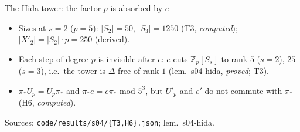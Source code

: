 \begin{frame}{The Hida tower: the factor $p$ is absorbed by $e$}
  \footnotesize
  \begin{center}
  \end{center}
  \begin{itemize}
    \item Sizes at $s=2$ ($p=5$): $|S_2|=50$, $|S_3|=1250$ (T3, \emph{computed}); $|X'_2|=|S_2|\cdot p=250$ (derived).
    \item Each step of degree $p$ is invisible after $e$: $e$ cuts $\mathbb Z_p[S_s]$ to rank $5$ ($s=2$), $25$ ($s=3$), i.e.\ the
      tower is $\Delta$-free of rank $1$ (lem.\ s04-hida, \emph{proved}; T3).
    \item $\pi_*U_p=U_p\pi_*$ and $\pi_*e=e\pi_*$ mod $5^3$, but $U'_p$ and $e'$ do not commute with $\pi_*$ (H6, \emph{computed}).
  \end{itemize}
  \vfill
  {\tiny Sources: \texttt{code/results/s04/\{T3,H6\}.json}; lem.\ s04-hida.}
\end{frame}
